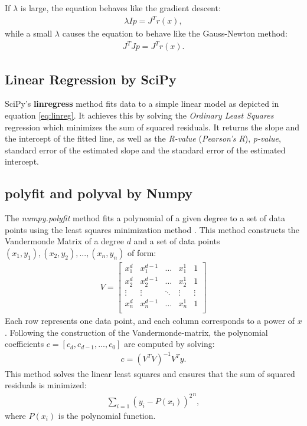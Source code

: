 If $\lambda$ is large, the equation behaves like the gradient descent:
\begin{align}
    \lambda I p= J^{T}r(x),
\end{align}
while a small $\lambda$ causes the equation to behave like the Gauss-Newton method:
\begin{align}
    J^{T}Jp=J^{T}r(x).
\end{align}
\cite{gavin2020levenberg} \cite{Levenberg-Marquardt} \cite{broxOptimierung}

\subsection{Linear Regression by SciPy}\label{subsec:linreg}
SciPy's \textbf{linregress} method fits data to a simple linear model as depicted in equation \ref{eq:linreg}. It achieves this by solving the \textit{Ordinary Least Squares} regression which minimizes the sum of squared residuals. It returns the slope and the intercept of the fitted line, as well as the \textit{R-value} (\textit{Pearson's R}), \textit{p-value}, standard error  of the estimated slope and the standard error of the estimated intercept.
\cite{SciPyLinRegress} \cite{Wooditch2021}

\subsection{polyfit and polyval by Numpy}\label{subsec:polyfit}
The \textit{numpy.polyfit} method fits a polynomial of a given degree to a set of data points using the least squares minimization method \cite{NumPyPolyfit}. This method constructs the Vandermonde Matrix of a degree $d$ and a set of data points $(x_{1}, y_{1}), (x_{2}, y_{2}), ...,(x_{n}, y_{n})$ of form:
\begin{align}
    V =
    \begin{bmatrix} 
        x_{1}^{d} & x_{1}^{d-1} & \dots & x_{1}^{1} & 1 \\
        x_{2}^{d} & x_{2}^{d-1} & \dots & x_{2}^{1} & 1 \\
        \vdots & \vdots & \ddots & \vdots & \vdots \\
        x_{n}^{d} & x_{n}^{d-1} & \dots & x_{n}^{1} & 1 \\ 
    \end{bmatrix}
\end{align}
Each row represents one data point, and each column corresponds to a power of $x$. Following the construction of the Vandermonde-matrix, the polynomial coefficients $c=[c_{d},c_{d-1},...,c_{0}]$ are computed by solving:
\begin{align}
    c=(V^{T}V)^{-1}V^{T}y.
\end{align}
This method solves the linear least squares and ensures that the sum of squared residuals is minimized:
\begin{align}
    \sum_{i=1}{(y_{i}-P(x_i))^{2}}^{n},
\end{align}
where $P(x_i)$ is the polynomial function. \cite{NumPyPolyfit} \cite{Vandermonde} \cite{GATechLS}

